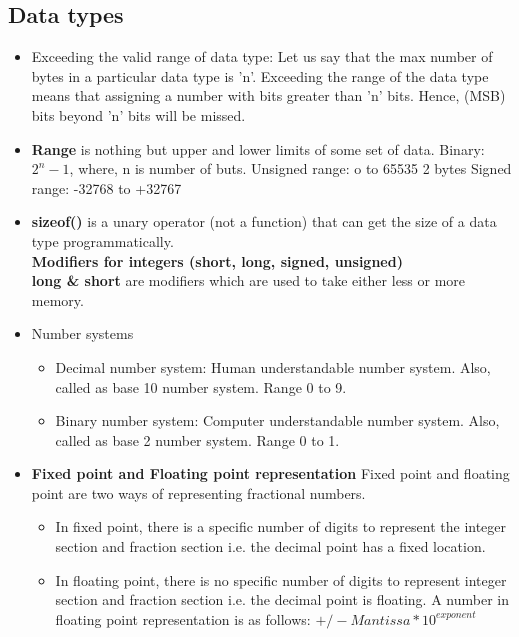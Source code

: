 \subsection{Data types}
\begin{itemize}
    \item Exceeding the valid range of data type:
    Let us say that the max number of bytes in a particular data type is 'n'. Exceeding the range of the data type means that assigning a number with bits greater than 'n' bits. Hence, (MSB) bits beyond 'n' bits will be missed.

    \item \textbf{Range} is nothing but upper and lower limits of some set of data. Binary: \(2^{n} - 1\), where, n is number of buts.
    Unsigned range: o to 65535 2 bytes
    Signed range: -32768 to +32767\\ 

    \item \textbf{sizeof()} is a unary operator (not a function) that  can get the size of a data type programmatically.\\
    \textbf{Modifiers for integers (short, long, signed, unsigned)}\\
    \textbf{long \& short} are modifiers which are used to take either less or more memory.

    \item Number systems 
    \begin{itemize}
        \item Decimal number system: Human understandable number system. Also, called as base 10  number system. Range 0 to 9.
        \item Binary number system: Computer understandable number system. Also, called as base 2 number system. Range 0 to 1.
    \end{itemize}       

    \item \textbf{Fixed point and Floating point representation}
    Fixed point and floating point are two ways of representing fractional numbers. 
    \begin{itemize}
        \item In fixed point, there is a specific number of digits to represent the integer section and fraction section  i.e. the decimal point has a fixed location. 
        \item In floating point, there is no specific number of digits to represent integer section and fraction section i.e. the decimal point is floating. A number in floating point representation is as follows:
        \(+/- Mantissa * 10^{exponent}\)
    \end{itemize}
\end{itemize}

